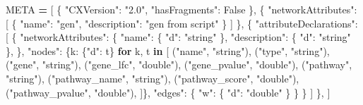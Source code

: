 \documentclass[
]{book}
\newenvironment{Shaded}{\begin{snugshade}}{\end{snugshade}}
\newcommand{\ControlFlowTok}[1]{\textcolor[rgb]{0.13,0.29,0.53}{\textbf{#1}}}
\newcommand{\KeywordTok}[1]{\textcolor[rgb]{0.13,0.29,0.53}{\textbf{#1}}}
\newcommand{\NormalTok}[1]{#1}
\newcommand{\OperatorTok}[1]{\textcolor[rgb]{0.81,0.36,0.00}{\textbf{#1}}}
\newcommand{\StringTok}[1]{\textcolor[rgb]{0.31,0.60,0.02}{#1}}
\newcommand{\VariableTok}[1]{\textcolor[rgb]{0.00,0.00,0.00}{#1}}
\begin{document}
\begin{Shaded}
\begin{Highlighting}[numbers=left,,]
\NormalTok{META }\OperatorTok{=}\NormalTok{ [}
\NormalTok{    \{}
        \StringTok{"CXVersion"}\NormalTok{: }\StringTok{"2.0"}\NormalTok{,}
        \StringTok{"hasFragments"}\NormalTok{: }\VariableTok{False}
\NormalTok{    \},}
\NormalTok{    \{}
        \StringTok{"networkAttributes"}\NormalTok{: [}
\NormalTok{            \{}
                \StringTok{"name"}\NormalTok{: }\StringTok{"gen"}\NormalTok{,}
                \StringTok{"description"}\NormalTok{: }\StringTok{"gen from script"}
\NormalTok{            \}}
\NormalTok{        ]}
\NormalTok{    \},}
\NormalTok{    \{}
        \StringTok{"attributeDeclarations"}\NormalTok{: [}
\NormalTok{            \{}
                \StringTok{"networkAttributes"}\NormalTok{: \{}
                    \StringTok{"name"}\NormalTok{: \{}
                        \StringTok{"d"}\NormalTok{: }\StringTok{"string"}
\NormalTok{                    \},}
                    \StringTok{"description"}\NormalTok{: \{}
                        \StringTok{"d"}\NormalTok{: }\StringTok{"string"}
\NormalTok{                    \},}
\NormalTok{                \},}
                \StringTok{"nodes"}\NormalTok{: \{k: \{}\StringTok{"d"}\NormalTok{: t\} }\ControlFlowTok{for}\NormalTok{ k, t }\KeywordTok{in}\NormalTok{ [}
\NormalTok{                    (}\StringTok{"name"}\NormalTok{, }\StringTok{"string"}\NormalTok{),}
\NormalTok{                    (}\StringTok{"type"}\NormalTok{, }\StringTok{"string"}\NormalTok{),}
\NormalTok{                    (}\StringTok{"gene"}\NormalTok{, }\StringTok{"string"}\NormalTok{),}
\NormalTok{                    (}\StringTok{"gene\_lfc"}\NormalTok{, }\StringTok{"double"}\NormalTok{),}
\NormalTok{                    (}\StringTok{"gene\_pvalue"}\NormalTok{, }\StringTok{"double"}\NormalTok{),}
\NormalTok{                    (}\StringTok{"pathway"}\NormalTok{, }\StringTok{"string"}\NormalTok{),}
\NormalTok{                    (}\StringTok{"pathway\_name"}\NormalTok{, }\StringTok{"string"}\NormalTok{),}
\NormalTok{                    (}\StringTok{"pathway\_score"}\NormalTok{, }\StringTok{"double"}\NormalTok{),}
\NormalTok{                    (}\StringTok{"pathway\_pvalue"}\NormalTok{, }\StringTok{"double"}\NormalTok{),}
\NormalTok{                ]\},}
                \StringTok{"edges"}\NormalTok{: \{}
                    \StringTok{"w"}\NormalTok{: \{}
                        \StringTok{"d"}\NormalTok{: }\StringTok{"double"}
\NormalTok{                    \}}
\NormalTok{                \}}
\NormalTok{            \}}
\NormalTok{        ]}
\NormalTok{    \},}
\NormalTok{]}


\end{Highlighting}
\end{Shaded}
\end{document}

